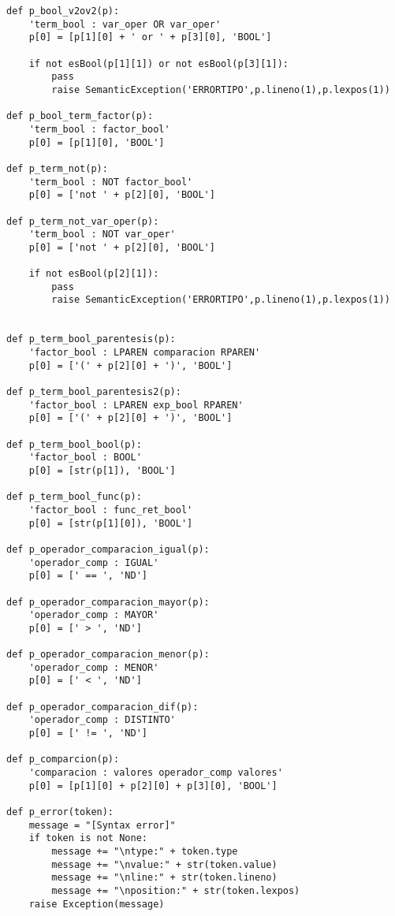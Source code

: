 \begin{verbatim}
def p_bool_v2ov2(p):
    'term_bool : var_oper OR var_oper'
    p[0] = [p[1][0] + ' or ' + p[3][0], 'BOOL']

    if not esBool(p[1][1]) or not esBool(p[3][1]):
        pass
        raise SemanticException('ERRORTIPO',p.lineno(1),p.lexpos(1))

def p_bool_term_factor(p):
    'term_bool : factor_bool'
    p[0] = [p[1][0], 'BOOL'] 

def p_term_not(p):
    'term_bool : NOT factor_bool'
    p[0] = ['not ' + p[2][0], 'BOOL']

def p_term_not_var_oper(p):
    'term_bool : NOT var_oper'
    p[0] = ['not ' + p[2][0], 'BOOL']

    if not esBool(p[2][1]):
        pass
        raise SemanticException('ERRORTIPO',p.lineno(1),p.lexpos(1))


def p_term_bool_parentesis(p):
    'factor_bool : LPAREN comparacion RPAREN'
    p[0] = ['(' + p[2][0] + ')', 'BOOL']

def p_term_bool_parentesis2(p):
    'factor_bool : LPAREN exp_bool RPAREN'
    p[0] = ['(' + p[2][0] + ')', 'BOOL']

def p_term_bool_bool(p):
    'factor_bool : BOOL'
    p[0] = [str(p[1]), 'BOOL']

def p_term_bool_func(p):
    'factor_bool : func_ret_bool'
    p[0] = [str(p[1][0]), 'BOOL']

def p_operador_comparacion_igual(p):
    'operador_comp : IGUAL'
    p[0] = [' == ', 'ND']

def p_operador_comparacion_mayor(p):
    'operador_comp : MAYOR'
    p[0] = [' > ', 'ND']

def p_operador_comparacion_menor(p):
    'operador_comp : MENOR'
    p[0] = [' < ', 'ND']

def p_operador_comparacion_dif(p):
    'operador_comp : DISTINTO'
    p[0] = [' != ', 'ND']

def p_comparcion(p):
    'comparacion : valores operador_comp valores'
    p[0] = [p[1][0] + p[2][0] + p[3][0], 'BOOL']

def p_error(token):
    message = "[Syntax error]"
    if token is not None:
        message += "\ntype:" + token.type
        message += "\nvalue:" + str(token.value)
        message += "\nline:" + str(token.lineno)
        message += "\nposition:" + str(token.lexpos)
    raise Exception(message)


\end{verbatim}



